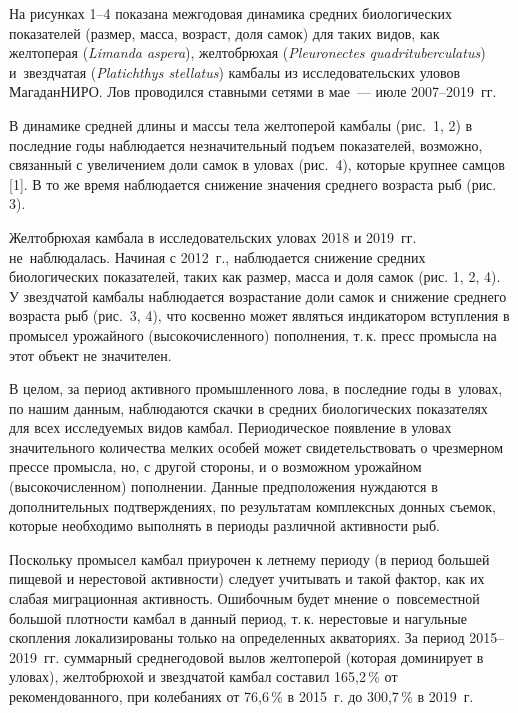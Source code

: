 На рисунках 1--4 показана межгодовая динамика средних биологических показателей (размер, масса, возраст, доля самок) для таких видов, как желтоперая (\textit{Limanda aspera}), желтобрюхая (\textit{Pleuronectes quadrituberculatus}) и~звездчатая (\textit{Platichthys stellatus}) камбалы из исследовательских уловов МагаданНИРО. Лов проводился ставными сетями в мае~--- июле 2007--2019~гг.
\clearpage





В динамике средней длины и массы тела желтоперой камбалы (рис.~1, 2) в последние годы наблюдается незначительный подъем показателей, возможно, связанный с увеличением доли самок в уловах (рис. 4), которые крупнее самцов [1]. В то же время наблюдается снижение значения среднего возраста рыб (рис. 3).

Желтобрюхая камбала в исследовательских уловах 2018 и 2019~гг. не~наблюдалась. Начиная с 2012~г., наблюдается снижение средних биологических показателей, таких как размер, масса и доля самок (рис. 1, 2, 4).
\clearpage
У звездчатой камбалы наблюдается возрастание доли самок и снижение среднего возраста рыб (рис. 3, 4), что косвенно может являться индикатором вступления в промысел урожайного (высокочисленного) пополнения, т.\,к. пресс промысла на этот объект не значителен.

В целом, за период активного промышленного лова, в последние годы в~уловах, по нашим данным, наблюдаются скачки в средних биологических показателях для всех исследуемых видов камбал. Периодическое появление в уловах значительного количества мелких особей может свидетельствовать о чрезмерном прессе промысла, но, с другой стороны, и о возможном урожайном (высокочисленном) пополнении. Данные предположения нуждаются в дополнительных подтверждениях, по результатам комплексных донных съемок, которые необходимо выполнять в периоды различной активности рыб.

Поскольку промысел камбал приурочен к летнему периоду (в период большей пищевой и нерестовой активности) следует учитывать и такой фактор, как их слабая миграционная активность. Ошибочным будет мнение о~повсеместной большой плотности камбал в данный период, т.\,к. нерестовые и нагульные скопления локализированы только на определенных акваториях. За период 2015--2019~гг. суммарный среднегодовой вылов желтоперой (которая доминирует в уловах), желтобрюхой и звездчатой камбал составил 165,2\,\% от рекомендованного, при колебаниях от 76,6\,\% в 2015~г. до 300,7\,\% в 2019~г.


